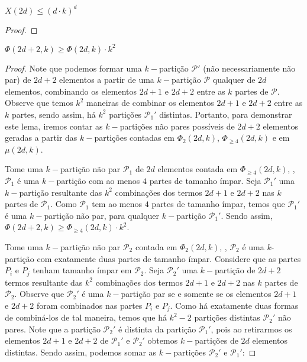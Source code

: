 \documentclass[12pt]{article}
\begin{document}
  \begin{lema}  
  	\label{lema7} 
  	$ X(2d) \leq (d{\cdot} k)^d$
  \end{lema}
  
  \begin{proof}
  	
  \end{proof} \newl
  
  \begin{lema} 
  	\label{lema8} 
  	$\Phi(2d+2, k) \geq \Phi(2d, k) {\cdot} k^{2}$
  \end{lema}
  
  \begin{proof}
  
  Note que podemos formar uma $k-$partição $\mathcal{P}'$ (não necessariamente não par) de $2d+2$ elementos a partir de uma $k-$partição $\mathcal{P}$ qualquer de $2d$ elementos, combinando os elementos $2d+1$ e $2d+2$ entre as $k$ partes de $\mathcal{P}$. Observe que temos $k^2$ maneiras de combinar os elementos $2d+1$ e $2d+2$ entre as $k$ partes, sendo assim, há $k^2$ partições $\mathcal{P}_1'$ distintas. Portanto, para demonstrar este lema, iremos contar as $k-$partições não pares possíveis de $2d+2$ elementos geradas a partir das $k-$partições contadas em $\Phi_2(2d, k) $, $\Phi_{\geq 4}(2d, k)$ e em $\mu(2d, k)$. 
  	
  Tome uma $k-$partição não par $\mathcal{P}_1$ de $2d$ elementos contada em $\Phi_{\geq 4}(2d, k)$, \ie, $\mathcal{P}_1$ é uma $k-$partição com ao menos $4$ partes de tamanho ímpar. Seja $\mathcal{P}_1'$ uma $k-$partição resultante das $k^2$ combinações dos termos $2d+1$ e $2d+2$ nas $k$ partes de $\mathcal{P}_1$. Como $\mathcal{P}_1$ tem ao menos $4$ partes de tamanho ímpar, temos que $\mathcal{P}_1'$ é uma $k-$partição não par, para qualquer $k-$partição $\mathcal{P}_1'$. Sendo assim, $\Phi(2d+2, k) \geq \Phi_{\geq 4}(2d, k) {\cdot} k^2$.
  
  	Tome uma $k-$partição não par $\mathcal{P}_2$ contada em $\Phi_{2}(2d, k)$, \ie, $\mathcal{P}_2$ é uma $k$-partição com exatamente duas partes de tamanho ímpar. Considere que as partes $P_i$ e $P_j$ tenham tamanho ímpar em $\mathcal{P}_2$. Seja $\mathcal{P}_2'$ uma $k-$partição de $2d+2$ termos resultante das $k^2$ combinações dos termos $2d+1$ e $2d+2$ nas $k$ partes de $\mathcal{P}_2$. Observe que $\mathcal{P}_2'$ é uma $k-$partição par se e somente se os elementos $2d+1$ e $2d+2$ foram combinados nas partes $P_i$ e $P_j$. Como há exatamente duas formas de combiná-los de tal maneira, temos que há $k^2 - 2$ partições distintas $\mathcal{P}_2'$ não pares. Note que a partição $\mathcal{P}_2'$ é distinta da partição $\mathcal{P}_1'$, pois ao retirarmos os elementos $2d+1$ e $2d+2$ de $\mathcal{P}_1'$ e $\mathcal{P}_2'$ obtemos $k-$partições de $2d$ elementos distintas. Sendo assim, podemos somar as $k-$partições $\mathcal{P}_2'$ e $\mathcal{P}_1'$:
   	 

\end{proof}
\end{document}
